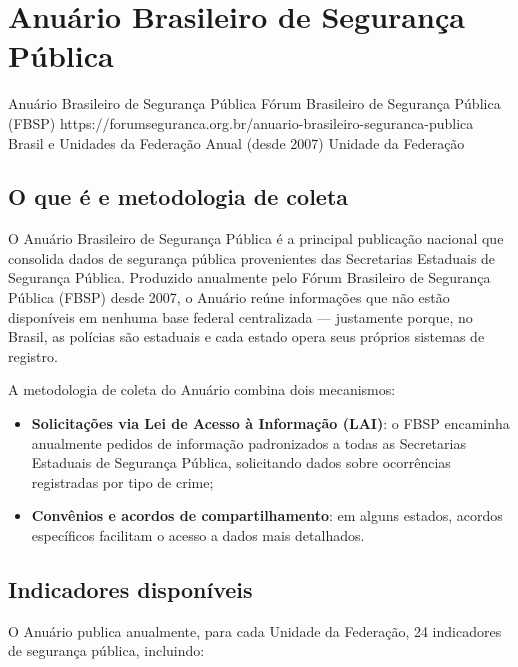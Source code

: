 \section{Anuário Brasileiro de Segurança Pública}

\ficharapida
  {Anuário Brasileiro de Segurança Pública}
  {Fórum Brasileiro de Segurança Pública (FBSP)}
  {https://forumseguranca.org.br/anuario-brasileiro-seguranca-publica}
  {Brasil e Unidades da Federação}
  {Anual (desde 2007)}
  {Unidade da Federação}

\subsection{O que é e metodologia de coleta}

O Anuário Brasileiro de Segurança Pública é a principal publicação nacional que consolida dados de segurança pública provenientes das Secretarias Estaduais de Segurança Pública. Produzido anualmente pelo Fórum Brasileiro de Segurança Pública (FBSP) desde 2007, o Anuário reúne informações que não estão disponíveis em nenhuma base federal centralizada --- justamente porque, no Brasil, as polícias são estaduais e cada estado opera seus próprios sistemas de registro.

A metodologia de coleta do Anuário combina dois mecanismos:
\begin{itemize}
  \item \textbf{Solicitações via Lei de Acesso à Informação (LAI)}: o FBSP encaminha anualmente pedidos de informação padronizados a todas as Secretarias Estaduais de Segurança Pública, solicitando dados sobre ocorrências registradas por tipo de crime;
  \item \textbf{Convênios e acordos de compartilhamento}: em alguns estados, acordos específicos facilitam o acesso a dados mais detalhados.
\end{itemize}

\subsection{Indicadores disponíveis}

O Anuário publica anualmente, para cada Unidade da Federação, 24 indicadores de segurança pública, incluindo:

